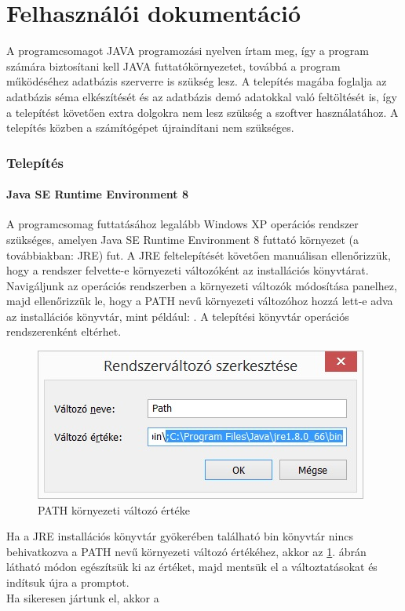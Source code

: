 \part{Felhasználói dokumentáció}
A programcsomagot JAVA programozási nyelven írtam meg, így a program számára biztosítani kell JAVA futtatókörnyezetet, továbbá a program működéséhez adatbázis szerverre is szükség lesz. A telepítés magába foglalja az adatbázis séma elkészítését és az adatbázis demó adatokkal való feltöltését is, így a telepítést követően extra dolgokra nem lesz szükség a szoftver használatához. A telepítés közben a számítógépet újraindítani nem szükséges.

\section{Telepítés}
\subsection{Java SE Runtime Environment 8}
A programcsomag futtatásához legalább Windows XP operációs rendszer szükséges, amelyen Java SE Runtime Environment 8 futtató környezet \cite{jresite} (a továbbiakban: JRE) fut. A JRE feltelepítését követően manuálisan ellenőrizzük, hogy a rendszer felvette-e környezeti változóként az installációs könyvtárat. Navigáljunk az operációs rendszerben a környezeti változók módosítása panelhez, majd ellenőrizzük le, hogy a PATH nevű környezeti változóhoz hozzá lett-e adva az installációs könyvtár, mint például: . A telepítési könyvtár operációs rendszerenként eltérhet.

\begin{figure}[h!]
  \caption{PATH környezeti változó értéke}
  \label{fig:path_env}
  \centering
    \includegraphics{user-documentation/images/path_env.jpg}
\end{figure}

Ha a JRE installációs könyvtár gyökerében található bin könyvtár nincs behivatkozva a PATH nevű környezeti változó értékéhez, akkor az \ref{fig:path_env}. ábrán látható módon egészítsük ki az értéket, majd mentsük el a változtatásokat és indítsuk újra a promptot. \\
Ha sikeresen jártunk el, akkor a

